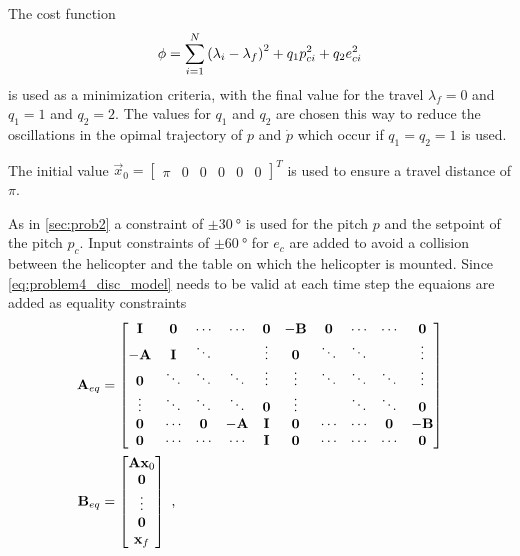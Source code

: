 The cost function 
\begin{equation}
\phi=\sum_{i=1}^{N}\left(\lambda_i-\lambda_f\right)^2+q_1p_{ci}^2+q_2e_{ci}^2
\end{equation}
is used as a minimization criteria, with the final value for the travel $\lambda_f=0$ and $q_1=1$ and $q_2=2$. The values for $q_1$ and $q_2$ are chosen this way to reduce the oscillations in the opimal trajectory of $p$ and $\dot{p}$ which occur if $q_1=q_2=1$ is used.

The initial value $\vec{x}_0=\begin{bmatrix}\pi & 0 & 0 & 0 & 0 & 0\end{bmatrix}^T$ is used to ensure a travel distance of $\pi$.


As in \cref{sec:prob2} a constraint of $\pm\SI{30}{\degree}$ is used for the pitch $p$ and the setpoint of the pitch $p_c$. Input constraints of $\pm\SI{60}{\degree}$ for $e_c$ are added to avoid a collision between the helicopter and the table on which the helicopter is mounted. Since \eqref{eq:problem4_disc_model} needs to be valid at each time step the equaions are added as equality constraints
\begin{subequations}
	\begin{align}
	\mathbf{A}_{eq}&=\begin{bmatrix}
	\mathbf{I} & \mathbf{0} & \cdots & \cdots & \mathbf{0} & -\mathbf{B} & \mathbf{0} & \cdots &\cdots & \mathbf{0}\\
	-\mathbf{A} & \mathbf{I} & \ddots & & \vdots & \mathbf{0} & \ddots & \ddots &  & \vdots\\
	\mathbf{0} & \ddots & \ddots & \ddots & \vdots & \vdots & \ddots & \ddots & \ddots &\vdots \\
	\vdots & \ddots & \ddots & \ddots & \mathbf{0} & \vdots &  & \ddots & \ddots &\mathbf{0} \\
	\mathbf{0} & \cdots & \mathbf{0} & -\mathbf{A} & \mathbf{I} & \mathbf{0} & \cdots & \cdots & \mathbf{0} &-\mathbf{B}\\
	\mathbf{0} & \cdots & \cdots & \cdots & \mathbf{I} & \mathbf{0} & \cdots & \cdots & \cdots & \mathbf{0}\\
	\end{bmatrix}\\
	\mathbf{B}_{eq}&=\begin{bmatrix}
	\mathbf{A}\mathbf{x}_0\\
	\mathbf{0}\\
	\vdots\\
	\mathbf{0}\\
	\mathbf{x}_f
	\end{bmatrix}\text{~,}
	\end{align}
\end{subequations}
